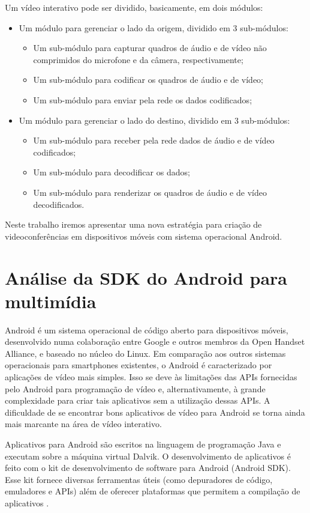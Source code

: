 \documentclass{acm_proc_article-sp}
\begin{document}
Um vídeo interativo pode ser dividido, basicamente, em dois módulos:
\begin{itemize}
 \item Um módulo para gerenciar o lado da origem, dividido em 3 sub-módulos:
 \begin{itemize}
  \item Um sub-módulo para capturar quadros de áudio e de vídeo não comprimidos do microfone e da câmera, respectivamente;
  \item Um sub-módulo para codificar os quadros de áudio e de vídeo;
  \item Um sub-módulo para enviar pela rede os dados codificados;
 \end{itemize}
 \item Um módulo para gerenciar o lado do destino, dividido em 3 sub-módulos:
 \begin{itemize}
  \item Um sub-módulo para receber pela rede dados de áudio e de vídeo codificados;
  \item Um sub-módulo para decodificar os dados;
  \item Um sub-módulo para renderizar os quadros de áudio e de vídeo decodificados.
 \end{itemize}
\end{itemize}

Neste trabalho iremos apresentar uma nova estratégia para criação de videoconferências em dispositivos móveis com sistema operacional Android.

\section{Análise da SDK do Android para multimídia}

Android é um sistema operacional de código aberto para dispositivos móveis, desenvolvido numa colaboração entre Google e outros membros da Open Handset Alliance, e baseado no núcleo do Linux. Em comparação aos outros sistemas operacionais para smartphones existentes, o Android é caracterizado por aplicações de vídeo mais simples. Isso se deve às limitações das APIs fornecidas pelo Android para programação de vídeo e, alternativamente, à grande complexidade para criar tais aplicativos sem a utilização dessas APIs. A dificuldade de se encontrar bons aplicativos de vídeo para Android se torna ainda mais marcante na área de vídeo interativo.

Aplicativos para Android são escritos na linguagem de programação Java e executam sobre a máquina virtual Dalvik. O desenvolvimento de aplicativos é feito com o kit de desenvolvimento de software para Android (Android SDK). Esse kit fornece diversas ferramentas úteis (como depuradores de código, emuladores e APIs) além de oferecer plataformas que permitem a compilação de aplicativos \cite{ableson_2009}.
\end{document}
